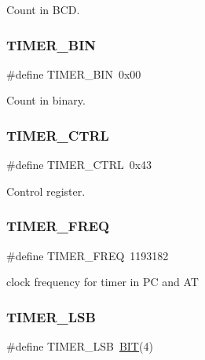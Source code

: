 Count in B\+CD. 

\mbox{\label{group__i8254_gad2913dcf2f91453317bd035589ac0a7d}} 
\subsubsection{\texorpdfstring{TIMER\_BIN}{TIMER\_BIN}}
{\footnotesize\ttfamily \#define T\+I\+M\+E\+R\+\_\+\+B\+IN~0x00}



Count in binary. 

\mbox{\label{group__i8254_ga282832448fb0281ef53d243c1cd48491}} 
\subsubsection{\texorpdfstring{TIMER\_CTRL}{TIMER\_CTRL}}
{\footnotesize\ttfamily \#define T\+I\+M\+E\+R\+\_\+\+C\+T\+RL~0x43}



Control register. 

\mbox{\label{group__i8254_gacf926951944b6cf370b7229ebd50dd8b}} 
\subsubsection{\texorpdfstring{TIMER\_FREQ}{TIMER\_FREQ}}
{\footnotesize\ttfamily \#define T\+I\+M\+E\+R\+\_\+\+F\+R\+EQ~1193182}



clock frequency for timer in PC and AT 

\mbox{\label{group__i8254_gac18cb814ebd0d67235392c330e0e3504}} 
\subsubsection{\texorpdfstring{TIMER\_LSB}{TIMER\_LSB}}
{\footnotesize\ttfamily \#define T\+I\+M\+E\+R\+\_\+\+L\+SB~\mbox{\hyperlink{realtimeclock_8h_a3a8ea58898cb58fc96013383d39f482c}{B\+IT}}(4)}



